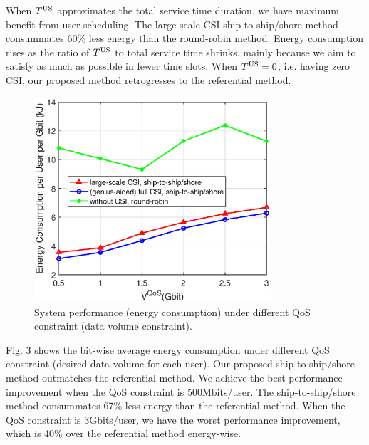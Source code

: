 \documentclass[journal]{IEEEtran}
\begin{document}
   When ${T^{\rm{US}}}$ approximates the total service time duration, we have maximum benefit from user scheduling. The large-scale CSI ship-to-ship/shore method consummates 60\% less energy than the round-robin method. 
   Energy consumption rises as the ratio of ${T^{\rm{US}}}$ to total service time shrinks, mainly because we aim to satisfy as much as possible in fewer time slots. When ${T^{\rm{US}}} = 0$, i.e. having zero CSI, our proposed method retrogresses to the referential method. 
   
   
   
   \begin{figure} [htb]
   \begin{center}
   \includegraphics*[width=8.8cm]{Cqos.eps}
   \end{center}
   \vspace*{-4mm} 
   \caption{System performance (energy consumption) under different QoS constraint (data volume constraint).}\label{fig:3}
   \vspace*{-2mm} 
   \end{figure}
   
   
   
   Fig. 3 shows the bit-wise average energy consumption under different QoS constraint (desired data volume for each user).
   Our proposed ship-to-ship/shore method outmatches the referential method. We achieve the best performance improvement when the QoS constraint is 500Mbits/user. The ship-to-ship/shore method consummates 67\% less energy than the referential method. When the QoS constraint is 3Gbits/user, we have the worst performance improvement, which is 40\% over the referential method energy-wise.
   
\end{document}
